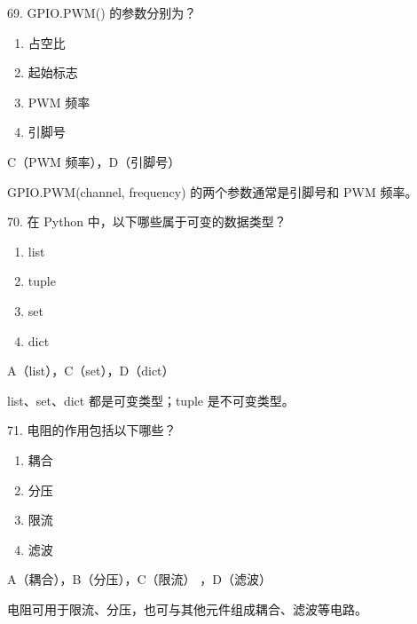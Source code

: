 \begin{question}{69. GPIO.PWM() 的参数分别为？}
\begin{enumerate}[label=\Alph*., leftmargin=2.4em, itemsep=0.2em]
\item 占空比
\item 起始标志
\item PWM 频率
\item 引脚号
\end{enumerate}
\end{question}
\begin{answer}
C（PWM 频率），D（引脚号）
\end{answer}
\begin{explanation}
GPIO.PWM(channel, frequency) 的两个参数通常是引脚号和 PWM 频率。
\end{explanation}

\begin{question}{70. 在 Python 中，以下哪些属于可变的数据类型？}
\begin{enumerate}[label=\Alph*., leftmargin=2.4em, itemsep=0.2em]
\item list
\item tuple
\item set
\item dict
\end{enumerate}
\end{question}
\begin{answer}
A（list），C（set），D（dict）
\end{answer}
\begin{explanation}
list、set、dict 都是可变类型；tuple 是不可变类型。
\end{explanation}

\begin{question}{71. 电阻的作用包括以下哪些？}
\begin{enumerate}[label=\Alph*., leftmargin=2.4em, itemsep=0.2em]
\item 耦合
\item 分压
\item 限流
\item 滤波
\end{enumerate}
\end{question}
\begin{answer}
A（耦合），B（分压），C（限流） ，D（滤波）
\end{answer}
\begin{explanation}
电阻可用于限流、分压，也可与其他元件组成耦合、滤波等电路。
\end{explanation}

